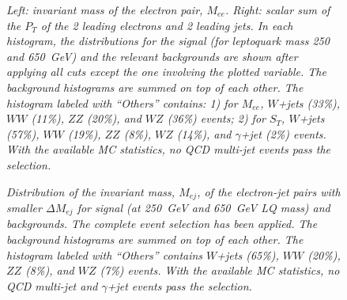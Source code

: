 \documentclass{cmspaper}
\begin{document}
\begin{linenumbers}
\begin{figure}[htbp]
\begin{center}
\begin{tabular}{cc}
    \end{tabular}
    \caption{\small \sl Left: invariant mass of the electron pair, $M_{ee}$. 
             Right: scalar sum of the $P_T$ of the 2 leading electrons and 2 leading jets. 
	     In each histogram, the distributions for the signal (for leptoquark mass 250 and 650~GeV) and the 
	     relevant backgrounds are shown after applying all cuts except the one involving the 
	     plotted variable. 
	     The background histograms are summed on top of each other.
	     The histogram labeled with ``Others'' contains: 1) for $M_{ee}$, $W$+jets (33\%), 
	     $WW$ (11\%), $ZZ$ (20\%), and $WZ$ (36\%) events; 2) for $S_{T}$, $W$+jets (57\%), 
	     $WW$ (19\%), $ZZ$ (8\%), $WZ$ (14\%), and $\gamma$+jet (2\%) events.
	     With the available MC statistics, no QCD multi-jet events pass 
	     the selection.}
    \label{fig:Mee_St_distributions}
  \end{center}
\end{figure}


\begin{figure}[htbp]
  \begin{center}
    \caption{\small \sl Distribution of the invariant mass, $M_{ej}$, of the electron-jet pairs 
      with smaller $\Delta M_{ej}$
      for signal (at 250~GeV and 650~GeV LQ mass) and backgrounds. 
      The complete event selection has been applied.
      The background histograms are summed on top of each other.
      The histogram labeled with ``Others'' contains $W$+jets (65\%), 
      $WW$ (20\%), $ZZ$ (8\%), and $WZ$ (7\%) events. 
      With the available MC statistics, no QCD multi-jet and $\gamma$+jet events pass 
      the selection.}
    \label{fig:Mej_allComb}
  \end{center}
\end{figure}


\end{linenumbers}
\end{document}
